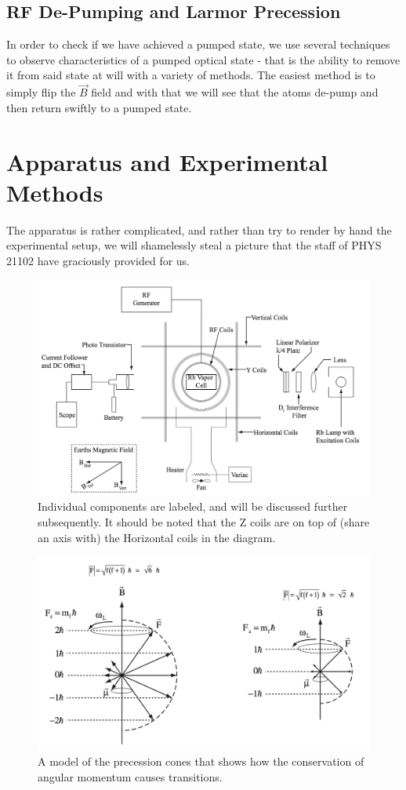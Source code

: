 \documentclass{article}
\begin{document}
  \subsection{RF De-Pumping and Larmor Precession}
    In order to check if we have achieved a pumped state, we use several techniques to observe characteristics of a pumped optical state - that is the ability to remove it from said state at will with a variety of methods.  The easiest method is to simply flip the $\vec{B}$ field and with that we will see that the atoms de-pump and then return swiftly to a pumped state.
\section{Apparatus and Experimental Methods}%
  The apparatus is rather complicated, and rather than try to render by hand the experimental setup, we will shamelessly steal a picture that the staff of PHYS 21102 have graciously provided for us.

  \begin{figure}[!htb]
    \centering
    \includegraphics[scale=.25]{apparatus.png}
    \caption{Individual components are labeled, and will be discussed further subsequently.  It should be noted that the Z coils are on top of (share an axis with) the Horizontal coils in the diagram.}
  \end{figure}

  \begin{figure}[!htb]
    \centering
    \includegraphics[scale=.25]{cones.png}
    \caption{A model of the precession cones that shows how the conservation of angular momentum causes transitions.}
  \end{figure}
\end{document}
